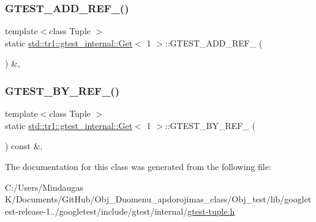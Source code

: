 \subsubsection{\texorpdfstring{GTEST\_ADD\_REF\_()}{GTEST\_ADD\_REF\_()}}
{\footnotesize\ttfamily template$<$class Tuple $>$ \\
static \mbox{\hyperlink{classstd_1_1tr1_1_1gtest__internal_1_1_get}{std\+::tr1\+::gtest\+\_\+internal\+::\+Get}}$<$ 1 $>$\+::G\+T\+E\+S\+T\+\_\+\+A\+D\+D\+\_\+\+R\+E\+F\+\_\+ (\begin{DoxyParamCaption}\item[{\mbox{\hyperlink{gtest-tuple_8h_a1b7f133d8aa02e0b7afed7b66781eeb7}{G\+T\+E\+S\+T\+\_\+\+T\+U\+P\+L\+E\+\_\+\+E\+L\+E\+M\+E\+N\+T\+\_\+}}(1, Tuple)}]{ }\end{DoxyParamCaption}) \&\hspace{0.3cm}{\ttfamily [inline]}, {\ttfamily [static]}}

\mbox{\label{classstd_1_1tr1_1_1gtest__internal_1_1_get_3_011_01_4_a481a2bf839c758408d46a1d0d41ff8f4}} 
\subsubsection{\texorpdfstring{GTEST\_BY\_REF\_()}{GTEST\_BY\_REF\_()}}
{\footnotesize\ttfamily template$<$class Tuple $>$ \\
static \mbox{\hyperlink{classstd_1_1tr1_1_1gtest__internal_1_1_get}{std\+::tr1\+::gtest\+\_\+internal\+::\+Get}}$<$ 1 $>$\+::G\+T\+E\+S\+T\+\_\+\+B\+Y\+\_\+\+R\+E\+F\+\_\+ (\begin{DoxyParamCaption}\item[{\mbox{\hyperlink{gtest-tuple_8h_a1b7f133d8aa02e0b7afed7b66781eeb7}{G\+T\+E\+S\+T\+\_\+\+T\+U\+P\+L\+E\+\_\+\+E\+L\+E\+M\+E\+N\+T\+\_\+}}(1, Tuple)}]{ }\end{DoxyParamCaption}) const \&\hspace{0.3cm}{\ttfamily [inline]}, {\ttfamily [static]}}



The documentation for this class was generated from the following file\+:\begin{DoxyCompactItemize}
\item 
C\+:/\+Users/\+Mindaugas K/\+Documents/\+Git\+Hub/\+Obj\+\_\+\+Duomenu\+\_\+apdorojimas\+\_\+class/\+Obj\+\_\+test/lib/googletest-\/release-\/1../googletest/include/gtest/internal/\mbox{\hyperlink{gtest-tuple_8h}{gtest-\/tuple.\+h}}\end{DoxyCompactItemize}
